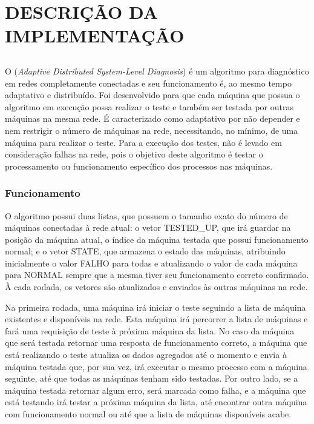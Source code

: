 
\chapter{DESCRIÇÃO DA IMPLEMENTAÇÃO}
\label{chap:descricao_da_implementacao}

\section{\adaptive{}}
\label{sec:adaptiveDSD}

O \adaptive (\textit{Adaptive Distributed System-Level Diagnosis}) é um algoritmo para diagnóstico em redes completamente conectadas e seu funcionamento é, ao mesmo tempo 
adaptativo e distribuído. Foi desenvolvido para que cada máquina que possua o algoritmo em execução possa realizar o teste e também ser testada por outras máquinas na mesma rede.
É caracterizado como adaptativo por não depender e nem restrigir o número de máquinas na rede, necessitando, no mínimo, de uma máquina para realizar o teste. Para a execução dos testes, não é levado
em consideração falhas na rede, pois o objetivo deste algoritmo é testar o processamento ou funcionamento específico dos processos nas máquinas.

\subsection{Funcionamento}
\label{sub:adaptiveDSD_Funcionamento}
O algoritmo possui duas listas, que possuem o tamanho exato do número de máquinas conectadas à rede atual: o vetor TESTED\_UP, que irá guardar na posição da máquina atual, 
o índice da máquina testada que possui funcionamento normal; e o vetor STATE, que armazena o estado das máquinas, atribuindo inicialmente o valor FALHO para todas e atualizando o valor de cada máquina para NORMAL sempre que a mesma tiver seu 
funcionamento correto confirmado. À cada rodada, os vetores são atualizados e enviados às outras máquinas na rede.

Na primeira rodada, uma máquina irá iniciar o teste seguindo a lista de máquina existentes e disponíveis na rede. Esta máquina irá percorrer a
lista de máquinas e fará uma requisição de teste à próxima máquina da lista. No caso da máquina que será testada retornar uma resposta de funcionamento correto, a máquina que está realizando o 
teste atualiza os dados agregados até o momento e envia à máquina testada que, por sua vez, irá executar o mesmo processo com a máquina seguinte, até que todas as máquinas tenham sido testadas. Por outro lado, se 
a máquina testada retornar algum erro, será marcada como falha, e a máquina que está testando irá testar a próxima máquina da lista, até encontrar outra máquina com funcionamento normal 
ou até que a lista de máquinas disponíveis acabe.

